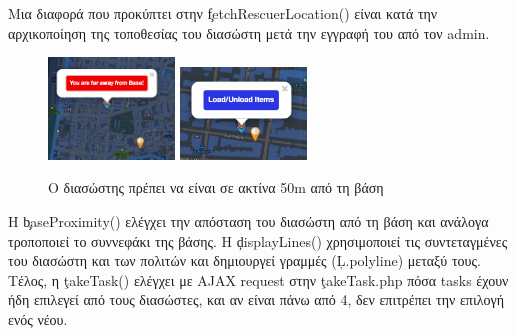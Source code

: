         Μια διαφορά που προκύπτει στην \c{fetchRescuerLocation()} είναι κατά την αρχικοποίηση της τοποθεσίας του διασώστη μετά την εγγραφή του από τον admin.

        \begin{figure}[H] \noindent \centering
            \includegraphics[width=0.3\textwidth]{img/rescuer-marker1}
            \includegraphics[width=0.3\textwidth]{img/rescuer-marker2}
            \caption{Ο διασώστης πρέπει να είναι σε ακτίνα 50m από τη βάση}
        \end{figure}

        Η \c{baseProximity()} ελέγχει την απόσταση του διασώστη από τη βάση και ανάλογα τροποποιεί το συννεφάκι της βάσης.
        Η \c{displayLines()} χρησιμοποιεί τις συντεταγμένες του διασώστη και των πολιτών και δημιουργεί γραμμές (\c{L.polyline}) μεταξύ τους.
        Τέλος, η \c{takeTask()} ελέγχει με AJAX request στην \c{takeTask.php} πόσα tasks έχουν ήδη επιλεγεί από τους διασώστες, και αν είναι πάνω από 4, δεν επιτρέπει την επιλογή ενός νέου.


